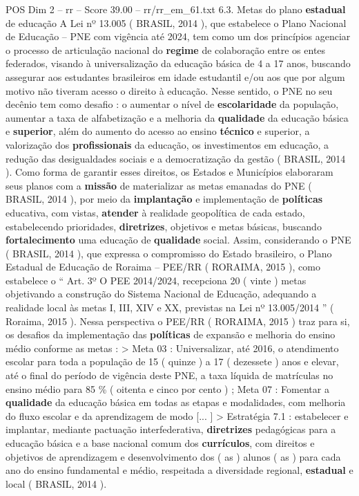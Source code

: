 \begin{textsample}{POS Dim 2 – rr – Score 39.00 – rr/rr\_em\_61.txt}  \label{ex:f2_pos_102}
6.3.
Metas do plano \textbf{estadual} de educação A Lei nº 13.005 ( BRASIL, 2014 ), que estabelece o Plano Nacional de Educação – PNE com vigência até 2024, tem como um dos princípios agenciar o processo de articulação nacional do \textbf{regime} de colaboração entre os entes federados, visando à universalização da educação básica de 4 a 17 anos, buscando assegurar aos estudantes brasileiros em idade estudantil e/ou aos que por algum motivo não tiveram acesso o direito à educação.
Nesse sentido, o PNE no seu decênio tem como desafio : o aumentar o nível de \textbf{escolaridade} da população, aumentar a taxa de alfabetização e a melhoria da \textbf{qualidade} da educação básica e \textbf{superior}, além do aumento do acesso ao ensino \textbf{técnico} e superior, a valorização dos \textbf{profissionais} da educação, os investimentos em educação, a redução das desigualdades sociais e a democratização da gestão ( BRASIL, 2014 ).
Como forma de garantir esses direitos, os Estados e Municípios elaboraram seus planos com a \textbf{missão} de materializar as metas emanadas do PNE ( BRASIL, 2014 ), por meio da \textbf{implantação} e implementação de \textbf{políticas} educativa, com vistas, \textbf{atender} à realidade geopolítica de cada estado, estabelecendo prioridades, \textbf{diretrizes}, objetivos e metas básicas, buscando \textbf{fortalecimento} uma educação de \textbf{qualidade} social.
Assim, considerando o PNE ( BRASIL, 2014 ), que expressa o compromisso do Estado brasileiro, o Plano Estadual de Educação de Roraima – PEE/RR ( RORAIMA, 2015 ), como estabelece o “ Art. 3º O PEE 2014/2024, recepciona 20 ( vinte ) metas objetivando a construção do Sistema Nacional de Educação, adequando a realidade local às metas I, III, XIV e XX, previstas na Lei nº 13.005/2014 ” ( Roraima, 2015 ).
Nessa perspectiva o PEE/RR ( RORAIMA, 2015 ) traz para si, os desafios da implementação das \textbf{políticas} de expansão e melhoria do ensino médio conforme as metas : > Meta 03 : Universalizar, até 2016, o atendimento escolar para toda a população de 15 ( quinze ) a 17 ( dezessete ) anos e elevar, até o final do período de vigência deste PNE, a taxa líquida de matrículas no ensino médio para 85 \% ( oitenta e cinco por cento ) ; Meta 07 : Fomentar a \textbf{qualidade} da educação básica em todas as etapas e modalidades, com melhoria do fluxo escolar e da aprendizagem de modo [... ] > Estratégia 7.1 : estabelecer e implantar, mediante pactuação interfederativa, \textbf{diretrizes} pedagógicas para a educação básica e a base nacional comum dos \textbf{currículos}, com direitos e objetivos de aprendizagem e desenvolvimento dos ( as ) alunos ( as ) para cada ano do ensino fundamental e médio, respeitada a diversidade regional, \textbf{estadual} e local ( BRASIL, 2014 ).

\end{textsample}
